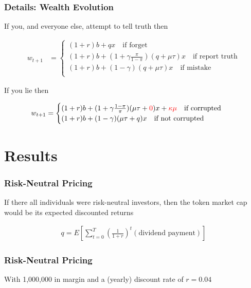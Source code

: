\documentclass[10pt]{beamer}
\begin{document}
\begin{frame} \frametitle{Details: Wealth Evolution}

  If you, and everyone else, attempt to tell truth then

  \begin{align*}
    w_{t+1} &= \begin{cases} (1 + r) b + q x \quad \text{if forget} \\
                             (1 + r) b + (1 + \gamma \frac{\pi}{1 - \pi}) (q + \mu \tau) x \quad \text{if report truth} \\
                             (1 + r) b + (1 - \gamma) (q + \mu \tau) x \quad \text{if mistake} \\
               \end{cases}
  \end{align*}

  If you lie then

  \begin{align*}
    w_{t+1} &= \begin{cases} (1 + r)b + (1 + \gamma \frac{1 - \pi}{\pi})(\mu \tau + {\color{red} 0}) x + {\color{red}\kappa \mu} \quad \text{if corrupted} \\
                             (1 + r)b + (1 - \gamma)(\mu \tau + q) x \quad \text{if not corrupted}
               \end{cases}
  \end{align*}

\end{frame}

\section{Results}

\begin{frame} \frametitle{Risk-Neutral Pricing}

  If there all individuals were risk-neutral investors, then the token market
  cap would be its expected discounted returns

  \begin{align*}
    q = E \left[ \sum_{t=0}^{T} \left(\frac{1}{1 + r} \right)^t (\text{dividend payment}) \right]
  \end{align*}

\end{frame}

\begin{frame} \frametitle{Risk-Neutral Pricing}

  With 1,000,000 in margin and a (yearly) discount rate of $r = 0.04$

  \begin{center}
    \resizebox{0.8\textwidth}{!}{}
  \end{center}

\end{frame}
\end{document}
